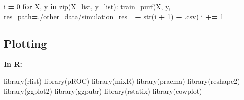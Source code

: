 \documentclass[
  11pt,
  oneside]{book}
\newenvironment{Shaded}{\begin{snugshade}}{\end{snugshade}}
\newcommand{\BuiltInTok}[1]{#1}
\newcommand{\ControlFlowTok}[1]{\textcolor[rgb]{0.13,0.29,0.53}{\textbf{#1}}}
\newcommand{\DecValTok}[1]{\textcolor[rgb]{0.00,0.00,0.81}{#1}}
\newcommand{\FunctionTok}[1]{\textcolor[rgb]{0.00,0.00,0.00}{#1}}
\newcommand{\KeywordTok}[1]{\textcolor[rgb]{0.13,0.29,0.53}{\textbf{#1}}}
\newcommand{\NormalTok}[1]{#1}
\newcommand{\OperatorTok}[1]{\textcolor[rgb]{0.81,0.36,0.00}{\textbf{#1}}}
\newcommand{\StringTok}[1]{\textcolor[rgb]{0.31,0.60,0.02}{#1}}
\begin{document}
\begin{Shaded}
\begin{Highlighting}[]
\NormalTok{i }\OperatorTok{=} \DecValTok{0}
\ControlFlowTok{for}\NormalTok{ X, y }\KeywordTok{in} \BuiltInTok{zip}\NormalTok{(X\_list, y\_list):}
\NormalTok{    train\_purf(X, y, res\_path}\OperatorTok{=}\StringTok{\textquotesingle{}./other\_data/simulation\_res\_\textquotesingle{}} \OperatorTok{+} \BuiltInTok{str}\NormalTok{(i }\OperatorTok{+} \DecValTok{1}\NormalTok{) }\OperatorTok{+} \StringTok{\textquotesingle{}.csv\textquotesingle{}}\NormalTok{)}
\NormalTok{    i }\OperatorTok{+=} \DecValTok{1}
\end{Highlighting}
\end{Shaded}

\hypertarget{plotting}{%
\subsection{Plotting}\label{plotting}}

\textbf{In R: }

\begin{Shaded}
\begin{Highlighting}[]
\FunctionTok{library}\NormalTok{(rlist)}
\FunctionTok{library}\NormalTok{(pROC)}
\FunctionTok{library}\NormalTok{(mixR)}
\FunctionTok{library}\NormalTok{(pracma)}
\FunctionTok{library}\NormalTok{(reshape2)}
\FunctionTok{library}\NormalTok{(ggplot2)}
\FunctionTok{library}\NormalTok{(ggpubr)}
\FunctionTok{library}\NormalTok{(rstatix)}
\FunctionTok{library}\NormalTok{(cowplot)}
\end{Highlighting}
\end{Shaded}
\end{document}
